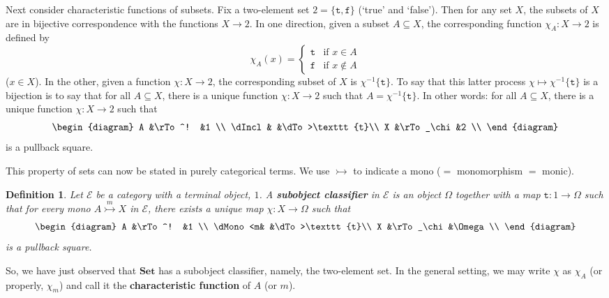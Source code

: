 \documentclass{article}
\newcommand{\cat}[1]{\mathscr{#1}}
\newcommand{\fcat}[1]{\mathbf{#1}}
\newcommand{\Set}{\fcat{Set}}
\newcommand{\demph}[1]{\textbf{\textup{#1}}}
\newcommand{\sub}{\subseteq}
\newcommand{\tr}{\texttt{t}}
\newcommand{\fa}{\texttt{f}}
\newcommand{\E}{\cat{E}}
\newcommand{\monic}{\rightarrowtail}
\newcommand{\monicby}[1]{\stackrel{#1}{\monic}}
\newcommand{\cln}{\colon}
\newtheorem{predefn}[thm]{Definition}
\newenvironment{defn}{\begin{predefn}\upshape}{\end{predefn}}
\begin{document}
Next consider characteristic functions of subsets.  Fix a two-element set $2 =
\{\tr, \fa\}$ (`true' and `false').  Then for any set $X$, the subsets of $X$
are in bijective correspondence with the functions $X \to 2$.  In one
direction, given a subset $A \sub X$, the corresponding function $\chi_A\cln X
\to 2$ is defined by
\[
\chi_A(x)
=
\begin{cases}
\tr     &\text{if } x \in A     \\
\fa     &\text{if } x \not\in A
\end{cases}
\]
($x \in X$).  In the other, given a function $\chi\cln X \to 2$, the
corresponding subset of $X$ is $\chi^{-1}\{\tr\}$.  To say that this latter
process $\chi \mapsto \chi^{-1}\{\tr\}$ is a bijection is to say that for all
$A \sub X$, there is a unique function $\chi\cln X \to 2$ such that $A =
\chi^{-1}\{\tr\}$.  In other words: for all $A \sub X$, there is a unique
function $\chi\cln X \to 2$ such that
\[
\begin{diagram}
A       &\rTo^!         &1              \\
\dIncl  &               &\dTo>\tr       \\
X       &\rTo_\chi      &2              \\
\end{diagram}
\]
is a pullback square.

This property of sets can now be stated in purely categorical terms.  We use
$\monic$ to indicate a mono ($=$ monomorphism $=$ monic).  

\begin{defn}
Let $\E$ be a category with a terminal object, $1$.  A \demph{subobject
classifier} in $\E$ is an object $\Omega$ together with a map $\tr\cln 1 \to
\Omega$ such that for every mono $A \monicby{m} X$ in $\E$, there exists a
unique map $\chi\cln X \to \Omega$ such that
\[
\begin{diagram}
A       &\rTo^!         &1              \\
\dMono<m&               &\dTo>\tr       \\
X       &\rTo_\chi      &\Omega         \\
\end{diagram}
\]
is a pullback square.
\end{defn}

So, we have just observed that $\Set$ has a subobject classifier, namely, the
two-element set.  In the general setting, we may write $\chi$ as $\chi_A$ (or
properly, $\chi_m$) and call it the \demph{characteristic function} of $A$ (or
$m$).
\end{document}

